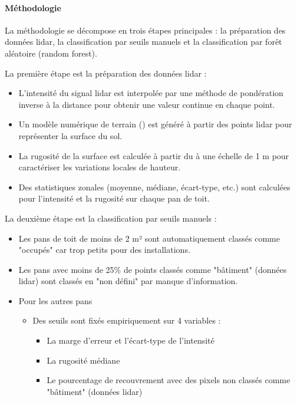 {{\paragraph{Méthodologie}
\par{La méthodologie se décompose en trois étapes principales : la préparation des données \gls{lidar}, la classification par seuils manuels et la classification par forêt aléatoire (random forest).}
\par{La première étape est la préparation des données \gls{lidar} :}
\begin{itemize}
    \item L'intensité du signal \gls{lidar} est interpolée par une méthode de pondération inverse à la distance pour obtenir une valeur continue en chaque point.
    \item Un modèle numérique de terrain () est généré à partir des points \gls{lidar} pour représenter la surface du sol.
    \item La rugosité de la surface est calculée à partir du  à une échelle de 1 m pour caractériser les variations locales de hauteur.
    \item Des statistiques zonales (moyenne, médiane, écart-type, etc.) sont calculées pour l'intensité et la rugosité sur chaque pan de toit.
\end{itemize}
\par{La deuxième étape est la classification par seuils manuels :}
\begin{itemize}
    \item Les pans de toit de moins de 2 m² sont automatiquement classés comme "occupés" car trop petits pour des installations.
    \item Les pans avec moins de 25\% de points classés comme "bâtiment" (données \gls{lidar}) sont classés en "non défini" par manque d'information.
    \item Pour les autres pans
    \begin{itemize}
        \item Des seuils sont fixés empiriquement sur 4 variables :
        \begin{itemize}
            \item La marge d'erreur et l'écart-type de l'intensité
            \item La rugosité médiane
            \item Le pourcentage de recouvrement avec des pixels non classés comme "bâtiment" (données \gls{lidar})
        \end{itemize}

\end{itemize}
\end{itemize}}}
